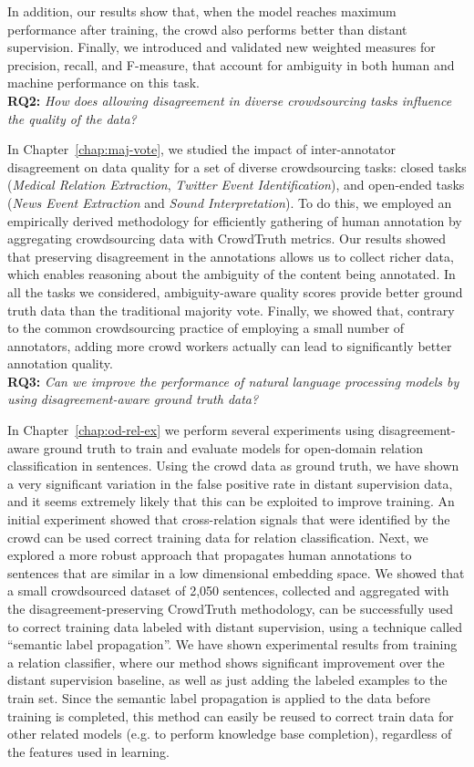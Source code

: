In addition, our results show that, when the model reaches maximum performance after training, the crowd also performs better than distant supervision. Finally, we introduced and validated new weighted measures for precision, recall, and F-measure, that account for ambiguity in both human and machine performance on this task. \\


\textbf{RQ2:} \textit{How does allowing disagreement in diverse crowdsourcing tasks influence the quality of the data?}

In Chapter~\ref{chap:maj-vote}, we studied the impact of inter-annotator disagreement on data quality for a set of diverse crowdsourcing tasks: closed tasks (\textit{Medical Relation Extraction}, \textit{Twitter Event Identification}), and open-ended tasks (\textit{News Event Extraction} and \textit{Sound Interpretation}). To do this, we employed an empirically derived methodology for efficiently gathering of human annotation by aggregating crowdsourcing data with CrowdTruth metrics. Our results showed that preserving disagreement in the annotations allows us to collect richer data, which enables reasoning about the ambiguity of the content being annotated. In all the tasks we considered, ambiguity-aware quality scores provide better ground truth data than the traditional majority vote. Finally, we showed that, contrary to the common crowdsourcing practice of employing a small number of annotators, adding more crowd workers actually can lead to significantly better annotation quality. \\


\textbf{RQ3:} \textit{Can we improve the performance of natural language processing models by using disagreement-aware ground truth data?}

In Chapter~\ref{chap:od-rel-ex} we perform several experiments using disagreement-aware ground truth to train and evaluate models for open-domain relation classification in sentences. Using the crowd data as ground truth, we have shown a very significant variation in the false positive rate in distant supervision data, and it seems extremely likely that this can be exploited to improve training. An initial experiment showed that cross-relation signals that were identified by the crowd can be used correct training data for relation classification. Next, we explored a more robust approach that propagates human annotations to sentences that are similar in a low dimensional embedding space. We showed that a small crowdsourced dataset of 2,050 sentences, collected and aggregated with the disagreement-preserving CrowdTruth methodology, can be successfully used to correct training data labeled with distant supervision, using a technique called ``semantic label propagation''.  We have shown experimental results from training a relation classifier, where our method shows significant improvement over the distant supervision baseline, as well as just adding the labeled examples to the train set. Since the semantic label propagation is applied to the data before training is completed, this method can easily be reused to correct train data for other related models (e.g. to perform knowledge base completion), regardless of the features used in learning. \\


